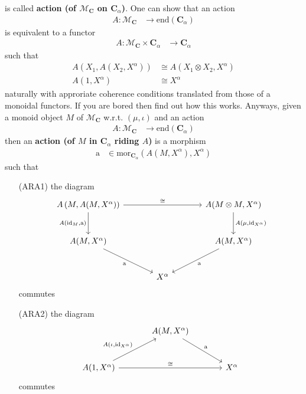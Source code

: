 is called \textbf{action (of $\mathcal{M}_{\mathbf{C}}$ on $\mathbf{C}_{\alpha}$)}. One can show that an action
\begin{align*}
  A
  \colon
  \mathcal{M}_{\mathbf{C}}
  &\rightarrow
  \mathrm{end}(\mathbf{C}_{\alpha})
\end{align*}
is equivalent to a functor
\begin{align*}
  A
  \colon
  \mathcal{M}_{\mathbf{C}}
  \times
  \mathbf{C}_{\alpha}
  &\rightarrow
  \mathbf{C}_{\alpha}
\end{align*}
such that
\begin{align*}
  A
  \left(
    X_{1},
    A(X_{2},X^{\alpha})
  \right)
  &\cong
  A
  \left(
    X_{1}
    \otimes
    X_{2},
    X^{\alpha}
  \right)
  \\
  A(1,X^{\alpha})
  &\cong
  X^{\alpha}
\end{align*}
naturally with approriate coherence conditions translated from those of a monoidal functors. If you are bored then find out how this works. Anyways, given a monoid object $M$ of $\mathcal{M}_{\mathbf{C}}$ w.r.t. $(\mu,\iota)$ and an action
\begin{align*}
  A
  \colon
  \mathcal{M}_{\mathbf{C}}
  &\rightarrow
  \mathrm{end}(\mathbf{C}_{\alpha})
\end{align*}
then an \textbf{action (of $M$ in $\mathbf{C}_{\alpha}$ riding $A$)} is a morphism
\begin{align*}
  \mathrm{a}
  &\in
  \mathrm{mor}_{\mathbf{C}_{\alpha}}
  \left(
    A(M,X^{\alpha}),
    X^{\alpha}
  \right)
\end{align*}
such that
\begin{enumerate}
\item[(ARA1)]
the diagram
\[
\begin{tikzcd}[sep=large]
  A
  \left(
    M,
    A(M,X^{\alpha})
  \right)
  \arrow{rr}{\cong}
  \arrow[swap]{d}{A(\mathrm{id}_{M},\mathrm{a})}
  &
  &
  A(M \otimes M,X^{\alpha})
  \arrow{d}{A(\mu,\mathrm{id}_{X^{\alpha}})}
  \\
  A(M,X^{\alpha})
  \arrow[swap]{dr}{\mathrm{a}}
  &
  &
  A(M,X^{\alpha})
  \arrow{dl}{\mathrm{a}}
  \\
  &
  X^{\alpha}
  &
\end{tikzcd}
\]
commutes
\item[(ARA2)]
the diagram
\[
\begin{tikzcd}[sep=large]
  &
  A(M,X^{\alpha})
  \arrow{dr}{\mathrm{a}}
  &
  \\
  A(1,X^{\alpha})
  \arrow{ur}{A(\iota,\mathrm{id}_{X^{\alpha}})}
  \arrow{rr}{\cong}
  &
  &
  X^{\alpha}
\end{tikzcd}
\]
commutes
\end{enumerate}
